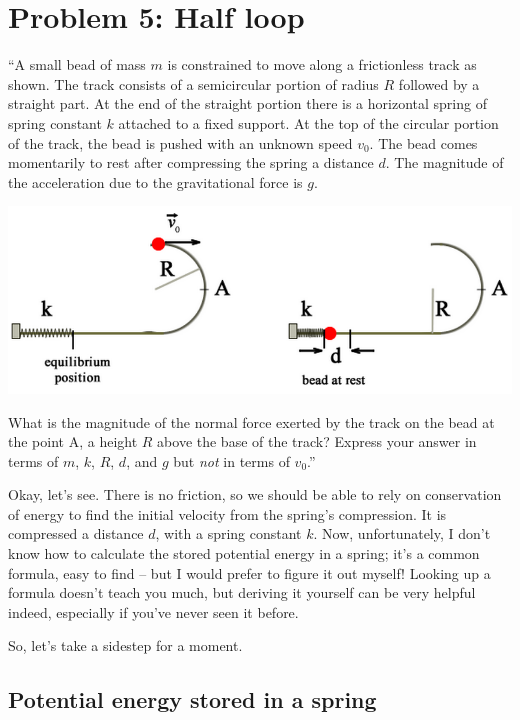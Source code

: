\documentclass[8.01x]{subfiles}
\begin{document}
\section{Problem 5: Half loop}

``A small bead of mass $m$ is constrained to move along a frictionless track as shown. The track consists of a semicircular portion of radius $R$ followed by a straight part. At the end of the straight portion there is a horizontal spring of spring constant $k$ attached to a fixed support. At the top of the circular portion of the track, the bead is pushed with an unknown speed $v_0$. The bead comes momentarily to rest after compressing the spring a distance $d$. The magnitude of the acceleration due to the gravitational force is $g$.

\begin{center}
\includegraphics[scale=0.6]{Graphics/h4p5}
\end{center}

What is the magnitude of the normal force exerted by the track on the bead at the point A, a height $R$ above the base of the track? Express your answer in terms of $m$, $k$, $R$, $d$, and $g$ but \emph{not} in terms of $v_0$.''

Okay, let's see. There is no friction, so we should be able to rely on conservation of energy to find the initial velocity from the spring's compression. It is compressed a distance $d$, with a spring constant $k$. Now, unfortunately, I don't know how to calculate the stored potential energy in a spring; it's a common formula, easy to find -- but I would prefer to figure it out myself! Looking up a formula doesn't teach you much, but deriving it yourself can be very helpful indeed, especially if you've never seen it before.

So, let's take a sidestep for a moment.

\subsection{Potential energy stored in a spring}
\end{document}
